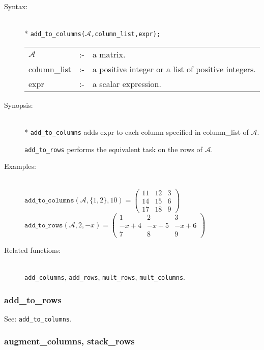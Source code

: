 \begin{description}
  \item[Syntax:]\mbox{}\\*
\texttt{add\_to\_columns($\mathcal{A}$,column\_list,expr);}\\[2mm]
\begin{tabular}{l l l}
$\mathcal{A}$   &:-& a matrix. \\
column\_list &:-& a positive integer or a list of positive integers. \\
expr        &:-& a scalar expression.
\end{tabular}

\item[Synopsis:]\mbox{}\\*
\texttt{add\_to\_columns} adds expr to each column specified in
column\_list of $\mathcal{A}$.

\texttt{add\_to\_rows} performs the equivalent task on the rows of
$\mathcal{A}$.

\item[Examples:]\mbox{}\\
  \(\texttt{add\_to\_columns}(\mathcal{A},\{1,2\},10)  =
  \begin{pmatrix} 11 & 12 & 3 \\ 14 & 15 & 6 \\ 17 & 18 & 9 \end{pmatrix}\) \\[2mm]
  \(\texttt{add\_to\_rows}(\mathcal{A},2,-x)  =
  \begin{pmatrix} 1 & 2 & 3 \\ -x+4 & -x+5 & -x+6 \\ 7 & 8 & 9 \end{pmatrix}\)

\item[Related functions:]\mbox{}\\
\texttt{add\_columns}, \texttt{add\_rows}, \texttt{mult\_rows},
\texttt{mult\_columns}.
\end{description}

\subsubsection{add\_to\_rows}
\label{linalg:add_to_rows}

See: \texttt{add\_to\_columns}.


\subsubsection{augment\_columns, stack\_rows}
\label{linalg:augment_columns}

